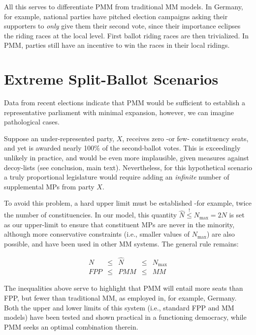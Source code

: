 \documentclass[DIV=calc, paper=a4, fontsize=11pt, twocolumn]{scrartcl}	 %
\begin{document}
All this serves to differentiate PMM from traditional MM models. 
In Germany, for example, national parties have pitched election campaigns asking their supporters to \emph{only} give them their second vote, since their importance eclipses the riding races at the local level. First ballot riding races are then trivialized. 
In PMM, parties still have an incentive to win the races in their local ridings.



\section{Extreme Split-Ballot Scenarios}

Data from recent elections indicate that PMM would be sufficient to establish a representative parliament with minimal expansion, however, we can imagine pathological cases. 

Suppose an under-represented party, $X$, receives zero \--or few\-- constituency seats, and yet is awarded nearly 100\% of the second-ballot votes.
This is exceedingly unlikely in practice, and would be even more implausible, given measures against decoy-lists (see conclusion, main text).
Nevertheless, for this hypothetical scenario a truly proportional legislature would require adding an \emph{infinite} number of supplemental MPs from party \textbf{$X$}.

To avoid this problem, a hard upper limit must be established \--for example, twice the number of constituencies. In our model, this quantity $\hat N \stackrel{!}{\le} N_{\textrm{max}} = 2 N$ is set as our upper-limit to ensure that constituent MPs are never in the minority, although more conservative constraints (i.e., smaller values of $N_{\textrm{max}}$) are also possible, and have been used in other MM systems. 
The general rule remains:

\begin{align}
\label{eq:Nlimits}
N &\le& \hat{N} &\le& N_{\textrm{max}} \\
FPP &\le& PMM &\le& MM
\end{align}

The inequalities above serve to highlight that PMM will entail more seats than FPP, but fewer than traditional MM, as employed in, for example, Germany. 
Both the upper and lower limits of this system (i.e., standard FPP and MM models) have been tested and shown practical in a functioning democracy, while PMM seeks an optimal combination therein.
\end{document}
